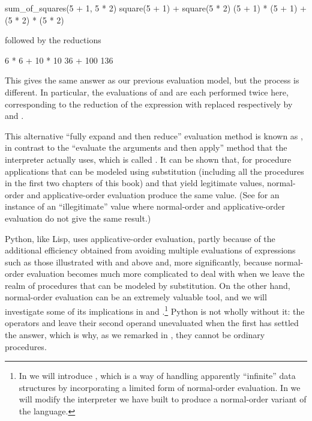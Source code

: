 \begin{syntaxForm}
sum_of_squares(5 + 1,          5 * 2)
square(5 + 1)                + square(5 * 2)
(5 + 1) * (5 + 1)            + (5 * 2) * (5 * 2)
\end{syntaxForm}

\noindent
followed by the reductions

\begin{syntaxForm}
6 * 6                        + 10 * 10
36                           + 100
              136
\end{syntaxForm}

\noindent
This gives the same answer as our previous evaluation model, but the process is
different.  In particular, the evaluations of  and 
are each performed twice here, corresponding to the reduction of the expression
 with  replaced respectively by  and
.

This alternative ``fully expand and then reduce'' evaluation method is known as
, in contrast to the ``evaluate the arguments
and then apply'' method that the interpreter actually uses, which is called
.  It can be shown that, for procedure
applications that can be modeled using substitution (including all the
procedures in the first two chapters of this book) and that yield legitimate
values, normal-order and applicative-order evaluation produce the same value.
(See  for an instance of an ``illegitimate'' value where
normal-order and applicative-order evaluation do not give the same result.)

Python, like Lisp, uses applicative-order evaluation, partly because of the
additional efficiency obtained from avoiding multiple evaluations of expressions
such as those illustrated with  and  above and, more
significantly, because normal-order evaluation becomes much more complicated to
deal with when we leave the realm of procedures that can be modeled by
substitution.  On the other hand, normal-order evaluation can be an extremely
valuable tool, and we will investigate some of its implications in  and .\footnote{In  we will introduce
, which is a way of handling apparently ``infinite''
data structures by incorporating a limited form of normal-order evaluation.  In
 we will modify the interpreter we have built to produce a
normal-order variant of the language.}  Python is not wholly without it: the
operators  and  leave their second operand unevaluated when
the first has settled the answer, which is why, as we remarked in
, they cannot be ordinary procedures.

